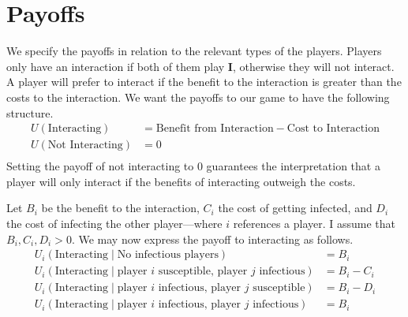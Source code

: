 \documentclass{article}
\theoremstyle{definition}
\theoremstyle{exercise}
\theoremstyle{remark}
\begin{document}
\section{Payoffs}
We specify the payoffs in relation to the relevant types of the players.
Players only have an interaction if both of them play $\bm{I}$, otherwise they will not interact.
A player will prefer to interact if the benefit to the interaction is greater than the costs to the interaction. We want the payoffs to our game to have the following structure. 
\begin{align*}
    U(\text{Interacting}) &= \text{Benefit from Interaction} - \text{Cost to Interaction} \\
    U(\text{Not Interacting}) &= 0 \\
\end{align*}
Setting the payoff of not interacting to $0$ guarantees the interpretation that a player will only interact if the benefits of interacting outweigh the costs.


Let $B_i$ be the benefit to the interaction, $C_i$ the cost of getting infected, and $D_i$ the cost of infecting the other player---where $i$ references a player. I assume that $B_i, C_i, D_i > 0$.
We may now express the payoff to interacting as follows.
\begin{align*}
    U_i(\text{Interacting} \;|\; \text{No infectious players}) &= B_i \\
    U_i(\text{Interacting} \;|\; \text{player $i$ susceptible, player $j$ infectious}) &= B_i - C_i \\
    U_i(\text{Interacting} \;|\; \text{player $i$ infectious, player $j$ susceptible}) &= B_i - D_i \\
    U_i(\text{Interacting} \;|\; \text{player $i$ infectious, player $j$ infectious}) &= B_i
\end{align*}
\end{document}
